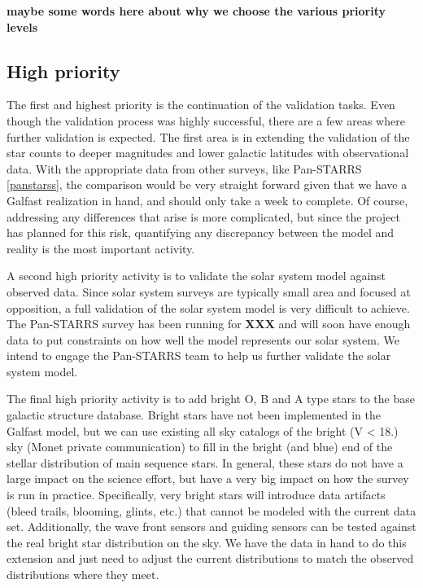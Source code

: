 \documentclass[11pt]{article}
\begin{document}
{\bf maybe some words here about why we choose the various priority levels}

\subsection{High priority}
The first 
and highest priority is the continuation of the validation tasks.  Even though the validation process was highly successful, there are a few areas
where further validation is expected.  The first area is in extending the validation of the star counts to deeper magnitudes and lower galactic
latitudes with observational data.  With the appropriate data from other surveys, like Pan-STARRS \ref{panstarss}, the comparison would
be very straight forward given that we have a Galfast realization in hand, and should only take a week to complete.  Of course, 
addressing any differences that arise is more complicated, but since the project has planned for this risk, quantifying any discrepancy between 
the model and reality is the most important activity.  

A second high priority activity is to validate the solar system model against observed data.  Since solar system surveys are typically small area
and focused at opposition, a full validation of the solar system model is very difficult to achieve.  The Pan-STARRS survey has been running for {\bf
XXX} and will soon have enough data to put constraints on how well the \citet{grav11} model represents our solar system.  We intend to engage the 
Pan-STARRS team to help us further validate the solar system model.

The final high priority activity is to add bright O, B and A type stars to the base galactic structure database.  Bright stars have not been implemented 
in the Galfast model, but we can use existing all sky catalogs of the bright (V < 18.) sky (Monet private communication) to fill in the bright (and blue)
end of the stellar distribution of main sequence stars.  In general, these stars do not have a large impact on the science effort, but have a very big 
impact on how the survey is run in practice.  Specifically, very bright stars will introduce data artifacts (bleed trails, blooming, glints, etc.) that
cannot be modeled with the current data set.  Additionally, the wave front sensors and guiding sensors can be tested against the real bright star distribution
on the sky. We have the data in hand to do this extension and just need to adjust the current distributions to match the observed distributions where they meet.
\end{document}
